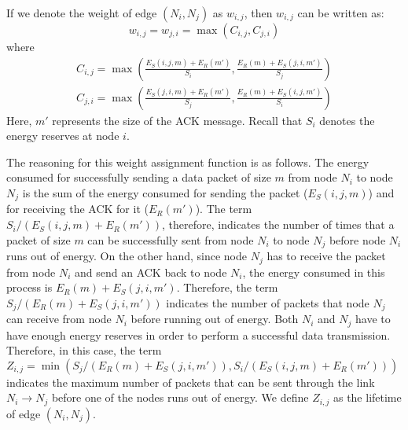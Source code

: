 \documentclass[journal,12pt,onecolumn]{IEEEtran}
\begin{document}
If we denote the weight of edge $(N_i,N_j)$ as $w_{i,j}$, then $w_{i,j}$ can be written as:
\begin{equation}\label{equ:weight}
w_{i,j}=w_{j,i}=\max(C_{i,j}, C_{j,i})
\end{equation}
where
\begin{equation}
\begin{split}
C_{i,j}=\max\left(\frac{E_{S}(i,j,m)+E_R(m')}{S_i}, \frac{E_R(m)+E_{S}(j,i,m')}{S_j}\right)\\
C_{j,i}=\max\left(\frac{E_{S}(j,i,m)+E_R(m')}{S_j}, \frac{E_R(m)+E_{S}(i,j,m')}{S_i}\right)\nonumber
\end{split}
\end{equation}
Here, $m'$ represents
the size of the ACK message. Recall that $S_i$ denotes the energy
reserves at node $i$. 

The reasoning for this weight assignment function is as follows. The
energy consumed for successfully sending a data packet of size $m$
from node $N_i$ to node $N_j$ is the sum of the energy consumed for
sending the packet ($E_S(i,j,m)$) and for receiving the ACK for it
($E_R(m')$). The term $S_i/(E_S(i,j,m)+E_R(m'))$, therefore, indicates the
number of times that a packet of size $m$ can be successfully sent
from node $N_i$ to node $N_j$ before node $N_i$ runs out of energy.
On the other hand, since node $N_j$ has to receive the packet from
node $N_i$ and send an ACK back to node $N_i$, the energy consumed
in this process is $E_R(m)+E_S(j,i,m')$. Therefore, the term
$S_j/(E_R(m)+E_S(j,i,m'))$ indicates the number of packets that node
$N_j$ can receive from node $N_i$ before running out of energy. Both
$N_i$ and $N_j$ have to have enough energy reserves in order to
perform a successful data transmission. Therefore, in this case, the
term
$Z_{i,j}=\min(S_j/(E_R(m)+E_S(j,i,m')),S_i/(E_S(i,j,m)+E_R(m')))$
indicates the maximum number of packets that can be sent through the
link $N_i\rightarrow N_j$ before one of the nodes runs out of
energy. We define $Z_{i,j}$ as the lifetime of edge $(N_i,N_j)$.
\end{document}
